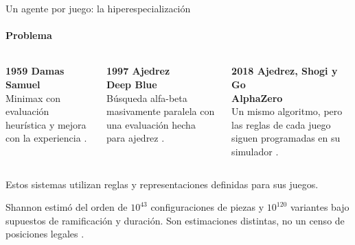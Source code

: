 \documentclass[aspectratio=169,10pt,t]{beamer}
\begin{document}
\begin{frame}{Un agente por juego: la hiperespecialización}
\framesubtitle{Problema}
\renewcommand{\tarjetaalto}{2.45cm}
\begin{columns}[T]
\begin{tarjeta}
{\scriptsize\bfseries\color{vino} 1959 \textperiodcentered{} Damas}\\[2pt]
{\normalsize\bfseries Samuel}\\[2pt]
Minimax con evaluación heurística y mejora con la experiencia \cite{Samuel1959}.
\end{tarjeta}
\begin{tarjeta}
{\scriptsize\bfseries\color{vino} 1997 \textperiodcentered{} Ajedrez}\\[2pt]
{\normalsize\bfseries Deep Blue}\\[2pt]
Búsqueda alfa-beta masivamente paralela con una evaluación hecha para ajedrez \cite{Campbell2002DeepBlue}.
\end{tarjeta}
\begin{tarjeta}
{\scriptsize\bfseries\color{vino} 2018 \textperiodcentered{} Ajedrez, Shogi y Go}\\[2pt]
{\normalsize\bfseries AlphaZero}\\[2pt]
Un mismo algoritmo, pero las reglas de cada juego siguen programadas en su simulador \cite{Silver2018AlphaZero}.
\end{tarjeta}
\end{columns}
\vspace{4pt}
\begin{banda}
\large Estos sistemas utilizan reglas y representaciones definidas para sus juegos.
\end{banda}
\vspace{2pt}
{\small Shannon estimó del orden de $10^{43}$ configuraciones de piezas y $10^{120}$ variantes bajo supuestos de ramificación y duración. Son estimaciones distintas, no un censo de posiciones legales \cite{Shannon1950}.\par}
\end{frame}
\end{document}
